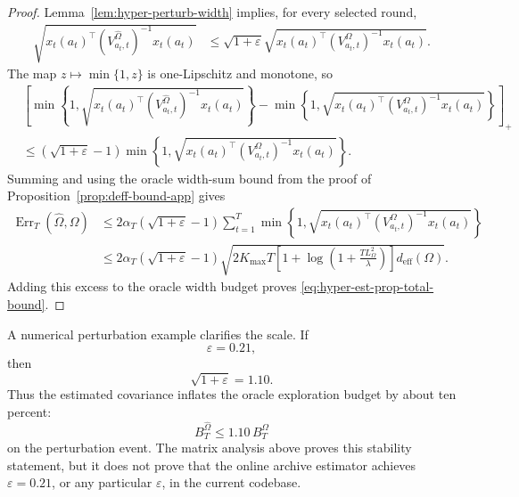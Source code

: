 \documentclass{article} %
\begin{document}
\begin{proof}
Lemma~\ref{lem:hyper-perturb-width} implies, for every selected round,
\begin{align}
\label{eq:hyper-est-proof-width}
\sqrt{
x_t(a_t)^\top
\left(V_{a_t,t}^{\widehat{\Omega}}\right)^{-1}
x_t(a_t)
}
&\le
\sqrt{1+\varepsilon}
\sqrt{
x_t(a_t)^\top
\left(V_{a_t,t}^{\Omega}\right)^{-1}
x_t(a_t)
}.
\end{align}
The map \(z\mapsto \min\{1,z\}\) is one-Lipschitz and monotone, so
\begin{align}
\label{eq:hyper-est-proof-min-diff}
&
\left[
\min\!\left\{
1,
\sqrt{
x_t(a_t)^\top
\left(V_{a_t,t}^{\widehat{\Omega}}\right)^{-1}
x_t(a_t)
}
\right\}
-
\min\!\left\{
1,
\sqrt{
x_t(a_t)^\top
\left(V_{a_t,t}^{\Omega}\right)^{-1}
x_t(a_t)
}
\right\}
\right]_{+}
\\
&\le
\left(\sqrt{1+\varepsilon}-1\right)
\min\!\left\{
1,
\sqrt{
x_t(a_t)^\top
\left(V_{a_t,t}^{\Omega}\right)^{-1}
x_t(a_t)
}
\right\}.
\end{align}
Summing and using the oracle width-sum bound from the proof of Proposition~\ref{prop:deff-bound-app} gives
\begin{align}
\label{eq:hyper-est-proof-err}
\operatorname{Err}_T(\widehat{\Omega},\Omega)
&\le
2\alpha_T
\left(\sqrt{1+\varepsilon}-1\right)
\sum_{t=1}^{T}
\min\!\left\{
1,
\sqrt{
x_t(a_t)^\top
\left(V_{a_t,t}^{\Omega}\right)^{-1}
x_t(a_t)
}
\right\}
\\
&\le
2\alpha_T
\left(\sqrt{1+\varepsilon}-1\right)
\sqrt{
2K_{\max}T
\left[
1+\log\!\left(1+\frac{TL_{\Omega}^{2}}{\lambda}\right)
\right]
d_{\mathrm{eff}}(\Omega)
}.
\end{align}
Adding this excess to the oracle width budget proves \eqref{eq:hyper-est-prop-total-bound}.
\end{proof}

A numerical perturbation example clarifies the scale.  If
\begin{equation}
\label{eq:hyper-est-example-eps}
\varepsilon=0.21,
\end{equation}
then
\begin{equation}
\label{eq:hyper-est-example-sqrt}
\sqrt{1+\varepsilon}=1.10 .
\end{equation}
Thus the estimated covariance inflates the oracle exploration budget by about ten percent:
\begin{equation}
\label{eq:hyper-est-example-factor}
B_T^{\widehat{\Omega}}
\le
1.10\,B_T^{\Omega}
\end{equation}
on the perturbation event.  The matrix analysis above proves this stability statement, but it does not prove that the online archive estimator achieves \(\varepsilon=0.21\), or any particular \(\varepsilon\), in the current codebase.
\end{document}
